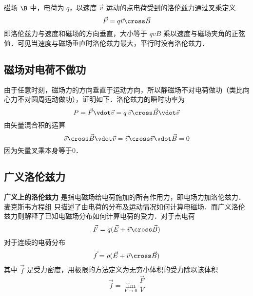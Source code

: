 磁场 $\B$ 中，电荷为 $q$，以速度 $\vec v$ 运动的点电荷受到的洛伦兹力通过叉乘定义
\begin{equation}
\vec F = q\vec v \cross \vec B
\end{equation}
即洛伦兹力与速度和磁场的方向垂直，大小等于 $qvB$ 乘以速度与磁场夹角的正弦值．可见当速度与磁场垂直时洛伦兹力最大，平行时没有洛伦兹力．

\subsection{磁场对电荷不做功}
由于任意时刻，磁场力的方向垂直于运动方向，所以静磁场不对电荷做功（类比向心力不对圆周运动做功），证明如下．洛伦兹力的瞬时功率为
\begin{equation}
P = \vec F \vdot \vec v = q\,\vec v \cross \vec B \vdot \vec v
\end{equation}
由矢量混合积的运算 %
\begin{equation}
\vec v \cross \vec B \vdot \vec v = \vec v \cross \vec v \vdot \vec B = 0
\end{equation}
因为矢量叉乘本身等于0．


\subsection{广义洛伦兹力}
\textbf{广义上的洛伦兹力} 是指电磁场给电荷施加的所有作用力，即电场力加洛伦兹力．麦克斯韦方程组%
只描述了由电荷的分布及运动情况如何计算电磁场．而广义洛伦兹力则解释了已知电磁场分布如何计算电荷的受力．对于点电荷
\begin{equation}
\vec F = q ( {\vec E + \vec v \cross \vec B})
\end{equation}
对于连续的电荷分布
\begin{equation}
\vec f = \rho ({\vec E + \vec v \cross \vec B})
\end{equation}
其中 $\vec f$ 是受力密度，用极限的方法定义为无穷小体积的受力除以该体积
\begin{equation}
\vec f = \mathop {\lim }\limits_{V \to 0} \frac{{\vec F}}{V}
\end{equation}

